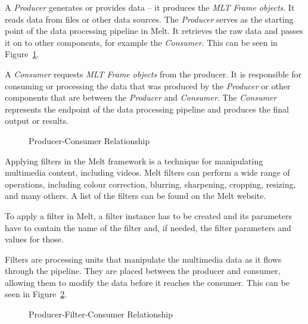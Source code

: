 \documentclass[../MasterThesis.tex]{subfiles}
\begin{document}
A \textit{Producer} generates or provides data -- it produces the \textit{MLT Frame objects}. 
It reads data from files or other data sources. The \textit{Producer} serves as the starting point of the data processing pipeline in Melt. It retrieves the raw data and passes it on to other components, for example the \textit{Consumer}. This can be seen in Figure~\ref{fig:producer_consumer}.

A \textit{Consumer} requests \textit{MLT Frame objects} from the producer.
It is responsible for consuming or processing the data that was produced by the \textit{Producer} or other components that are between the \textit{Producer} and \textit{Consumer}. 
The \textit{Consumer} represents the endpoint of the data processing pipeline and produces the final output or results.



\begin{figure}[H]
	\centering
	\caption{Producer-Consumer Relationship}
	\label{fig:producer_consumer}
\end{figure}

Applying filters in the Melt framework is a technique for manipulating multimedia content, including videos. 
Melt filters can perform a wide range of operations, including colour correction, blurring, sharpening, cropping, resizing, and many others. A list of the filters can be found on the Melt website.~\cite{melt_filters}

To apply a filter in Melt, a filter instance has to be created and its parameters have to contain the name of the filter and, if needed, the filter parameters and values for those.

Filters are processing units that manipulate the multimedia data as it flows through the pipeline. They are placed between the producer and consumer, allowing them to modify the data before it reaches the consumer. This can be seen in Figure~\ref{fig:producer_filter_consumer}.



\begin{figure}[H]
	\centering
	\caption{Producer-Filter-Consumer Relationship}
	\label{fig:producer_filter_consumer}
\end{figure}
\end{document}
